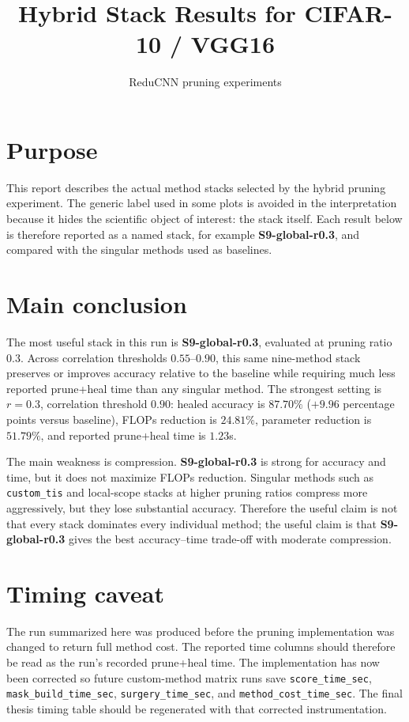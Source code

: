 \documentclass[11pt]{article}
\title{Hybrid Stack Results for CIFAR-10 / VGG16}
\author{ReduCNN pruning experiments}
\date{}
\newcommand{\stackname}[1]{\textbf{#1}}
\begin{document}
\maketitle

\section*{Purpose}
This report describes the actual method stacks selected by the hybrid pruning experiment.  The generic label used in some plots is avoided in the interpretation because it hides the scientific object of interest: the stack itself.  Each result below is therefore reported as a named stack, for example \stackname{S9-global-r0.3}, and compared with the singular methods used as baselines.

\section*{Main conclusion}
The most useful stack in this run is \stackname{S9-global-r0.3}, evaluated at pruning ratio $0.3$.  Across correlation thresholds $0.55$--$0.90$, this same nine-method stack preserves or improves accuracy relative to the baseline while requiring much less reported prune+heal time than any singular method.  The strongest setting is $r=0.3$, correlation threshold $0.90$: healed accuracy is $87.70\%$ ($+9.96$ percentage points versus baseline), FLOPs reduction is $24.81\%$, parameter reduction is $51.79\%$, and reported prune+heal time is $1.23$s.

The main weakness is compression.  \stackname{S9-global-r0.3} is strong for accuracy and time, but it does not maximize FLOPs reduction.  Singular methods such as \texttt{custom\_tis} and local-scope stacks at higher pruning ratios compress more aggressively, but they lose substantial accuracy.  Therefore the useful claim is not that every stack dominates every individual method; the useful claim is that \stackname{S9-global-r0.3} gives the best accuracy--time trade-off with moderate compression.

\section*{Timing caveat}
The run summarized here was produced before the pruning implementation was changed to return full method cost.  The reported time columns should therefore be read as the run's recorded prune+heal time.  The implementation has now been corrected so future custom-method matrix runs save \texttt{score\_time\_sec}, \texttt{mask\_build\_time\_sec}, \texttt{surgery\_time\_sec}, and \texttt{method\_cost\_time\_sec}.  The final thesis timing table should be regenerated with that corrected instrumentation.
\end{document}
